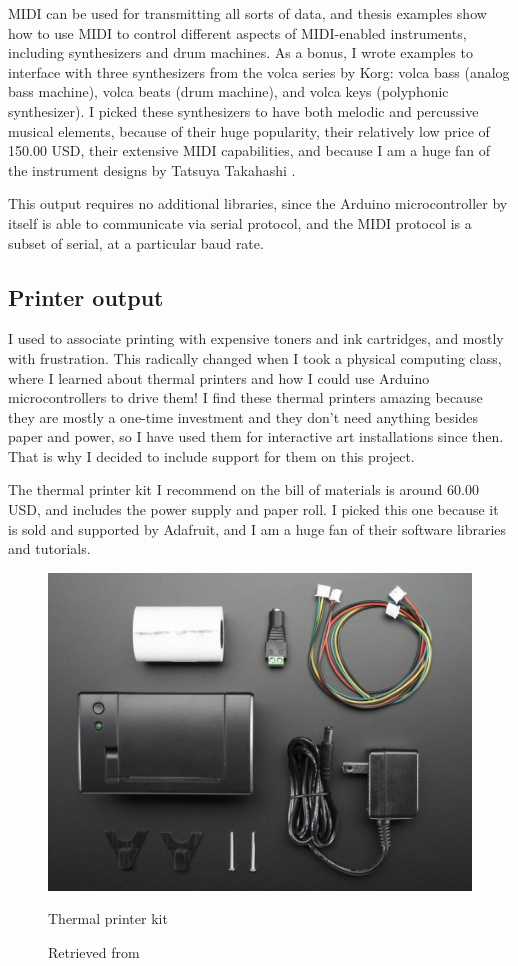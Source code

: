 MIDI can be used for transmitting all sorts of data, and thesis examples show how to use MIDI to control different aspects of MIDI-enabled instruments, including synthesizers and drum machines. As a bonus, I wrote examples to interface with three synthesizers from the volca series by Korg: volca bass (analog bass machine), volca beats (drum machine), and volca keys (polyphonic synthesizer). I picked these synthesizers to have both melodic and percussive musical elements, because of their huge popularity, their relatively low price of 150.00 USD, their extensive MIDI capabilities, and because I am a huge fan of the instrument designs by Tatsuya Takahashi \cite{website-tatsuya-takahashi}.

This output requires no additional libraries, since the Arduino microcontroller by itself is able to communicate via serial protocol, and the MIDI protocol is a subset of serial, at a particular \gls{baud} rate.

\subsection{Printer output}

I used to associate printing with expensive toners and ink cartridges, and mostly with frustration. This radically changed when I took a physical computing class, where I learned about thermal printers and how I could use Arduino microcontrollers to drive them! I find these thermal printers amazing because they are mostly a one-time investment and they don't need anything besides paper and power, so I have used them for interactive art installations since then. That is why I decided to include support for them on this project.

The thermal printer kit I recommend on the bill of materials is around 60.00 USD, and includes the power supply and paper roll. I picked this one because it is sold and supported by Adafruit, and I am a huge fan of their software libraries and tutorials. 

\begin{figure}[ht]
  \centering
  \includegraphics[width=0.75\linewidth,height=0.25\textheight,keepaspectratio]{images/materials-adafruit-thermal-printer.jpg}
  \caption{Thermal printer kit}
  \caption*{Retrieved from \cite{website-materials-adafruit-thermal-printer}}
  \label{fig:materials-adafruit-thermal-printer}
\end{figure}

